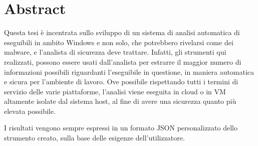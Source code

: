 \section*{Abstract}
Questa tesi è incentrata sullo sviluppo di un sistema di analisi automatica di eseguibili in ambito Windows e non solo, che potrebbero rivelarsi come dei malware, e l'analista di sicurezza deve trattare.
Infatti, gli strumenti qui realizzati, possono essere usati dall'analista per estrarre il maggior numero di informazioni possibili riguardanti l'eseguibile in questione, in maniera automatica e sicura per l'ambiente di lavoro.
Ove possibile rispettando tutti i termini di servizio delle varie piattaforme, l'analisi viene eseguita in cloud o in VM altamente isolate dal sistema host, al fine di avere una sicurezza quanto più elevata possibile.

I risultati vengono sempre espressi in un formato JSON personalizzato dello strumento creato, sulla base delle esigenze dell'utilizzatore.